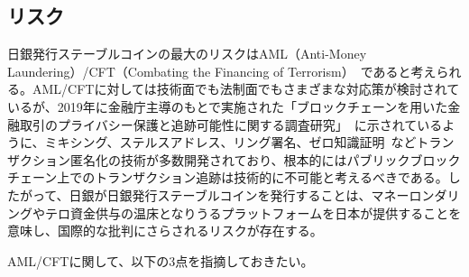 \documentclass[dvipdfmx,a4paper]{jsarticle}
\begin{document}
\subsection{リスク}

日銀発行ステーブルコインの最大のリスクはAML（Anti-Money Laundering）/CFT（Combating the Financing of Terrorism）~\cite{verdugo2011compliance}であると考えられる。AML/CFTに対しては技術面でも法制面でもさまざまな対応策が検討されているが、2019年に金融庁主導のもとで実施された「ブロックチェーンを用いた金融取引のプライバシー保護と追跡可能性に関する調査研究」~\cite{blockchainprivacy}に示されているように、ミキシング、ステルスアドレス、リング署名、ゼロ知識証明~\cite{sasson2014zerocash}などトランザクション匿名化の技術が多数開発されており、根本的にはパブリックブロックチェーン上でのトランザクション追跡は技術的に不可能と考えるべきである。したがって、日銀が日銀発行ステーブルコインを発行することは、マネーロンダリングやテロ資金供与の温床となりうるプラットフォームを日本が提供することを意味し、国際的な批判にさらされるリスクが存在する。

AML/CFTに関して、以下の3点を指摘しておきたい。
\end{document}
